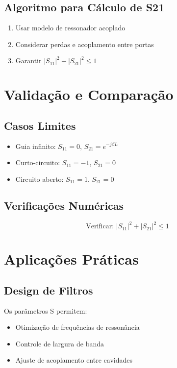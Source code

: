 \documentclass[a4paper,12pt]{article}
\begin{document}
\subsection{Algoritmo para Cálculo de S21}
\begin{enumerate}
    \item Usar modelo de ressonador acoplado
    \item Considerar perdas e acoplamento entre portas
    \item Garantir $|S_{11}|^2 + |S_{21}|^2 \leq 1$
\end{enumerate}

\section{Validação e Comparação}

\subsection{Casos Limites}
\begin{itemize}
    \item Guia infinito: $S_{11} = 0$, $S_{21} = e^{-j\beta L}$
    \item Curto-circuito: $S_{11} = -1$, $S_{21} = 0$
    \item Circuito aberto: $S_{11} = 1$, $S_{21} = 0$
\end{itemize}

\subsection{Verificações Numéricas}
\begin{equation}
\text{Verificar: } |S_{11}|^2 + |S_{21}|^2 \leq 1
\end{equation}

\section{Aplicações Práticas}

\subsection{Design de Filtros}
Os parâmetros S permitem:
\begin{itemize}
    \item Otimização de frequências de ressonância
    \item Controle de largura de banda
    \item Ajuste de acoplamento entre cavidades
\end{itemize}
\end{document}

